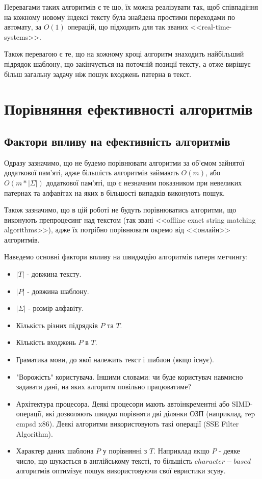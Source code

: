 \documentclass[a4paper,14pt]{extarticle} %
\begin{document}
Перевагами таких алгоритмів є те що, їх можна реалізувати так, щоб співпадіння на кожному новому індексі тексту була знайдена  простими переходами по автомату, за $O(1)$ операцій, що підходить для так званих <<real-time-systems>>.

Також перевагою є те, що на кожному кроці алгоритм знаходить найбільший підрядок шаблону, що закінчується на поточній позиції тексту, а отже вирішує більш загальну задачу ніж пошук входжень патерна в текст.
	\newpage
    \section{Порівняння ефективності алгоритмів}

	\subsection{Фактори впливу на ефективність алгоритмів}

	Одразу зазначимо, що не будемо порівнювати алгоритми за об'ємом зайнятої додаткової пам'яті, адже більшість алгоритмів займають $O(m)$, або $O(m*|\Sigma|)$ додаткової пам'яті, що є незначним показником при невеликих патернах та алфавітах на яких в більшості випадків виконують пошук.
	
	Також зазначимо, що в цій роботі не будуть порівнюватись алгоритми, що виконують препроцесинг над текстом (так звані <<offline exact string matching algorithms>>), адже їх потрібно порівнювати окремо від <<онлайн>> алгоритмів.

	Наведемо основні фактори впливу на швидкодію алгоритмів патерн метчингу:
	\begin{itemize}
		\item $|T|$ - довжина тексту.
		\item $|P|$ - довжина шаблону.
		\item $|\Sigma|$ - розмір алфавіту.
		\item Кількість різних підрядків $P$ та $T$.
		\item Кількість входжень $P$ в $T$.
		\item Граматика мови, до якої належить текст і шаблон (якщо існує).
		\item "Ворожість" користувача. Іншими словами: чи буде користувач навмисно задавати дані, на яких алгоритм повільно працюватиме?
		\item Архітектура процесора. Деякі процесори мають автоінкрементні або SIMD-операції, які дозволяють швидко порівняти дві ділянки ОЗП (наприклад, rep cmpsd x86). Деякі алгоритми використовують такі операції (SSE Filter Algorithm).
		\item Характер даних шаблона $P$ у порівнянні з $T$. Наприклад якщо $P$ - деяке число, що шукається в англійському тексті, то більшість $character-based$ алгоритмів оптимізує пошук використовуючи свої евристики зсуву. 
	\end{itemize}
\end{document}
